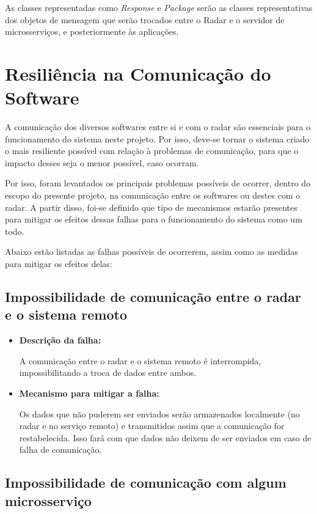 As classes representadas como \textit{Response} e \textit{Package} serão as classes representativas dos objetos de mensagem que serão trocados entre o Radar e o servidor de microsserviços, e posteriormente às aplicações.

\section{Resiliência na Comunicação do Software}

A comunicação dos diversos softwares entre si e com o radar são essenciais para o funcionamento do sistema neste projeto. Por isso, deve-se tornar o sistema criado o mais resiliente possível com relação à problemas de comunicação, para que o impacto desses seja o menor possível, caso ocorram.

Por isso, foram levantados os principais problemas possíveis de ocorrer, dentro do escopo do presente projeto, na comunicação entre os softwares ou destes com o radar. A partir disso, foi-se definido que tipo de mecanismos estarão presentes para mitigar os efeitos dessas falhas para o funcionamento do sistema como um todo.

Abaixo estão listadas as falhas possíveis de ocorrerem, assim como as medidas para mitigar os efeitos delas:

\subsection{Impossibilidade de comunicação entre o radar e o sistema remoto}

\begin{itemize}
    \item \textbf{Descrição da falha:}

    A comunicação entre o radar e o sistema remoto é interrompida, impossibilitando a troca de dados entre ambos.

    \item \textbf{Mecanismo para mitigar a falha:}

    Os dados que não puderem ser enviados serão armazenados localmente (no radar e no serviço remoto) e transmitidos assim que a comunicação for restabelecida. Isso fará com que dados não deixem de ser enviados em caso de falha de comunicação.
\end{itemize}

\subsection{Impossibilidade de comunicação com algum microsserviço}

